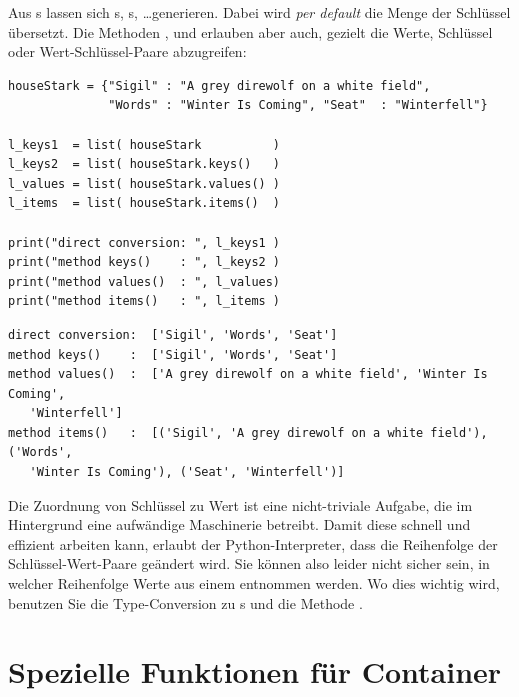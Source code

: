 Aus s lassen sich s, s, \ldots generieren. Dabei wird \emph{per default} die Menge der Schlüssel übersetzt. Die Methoden ,  und  erlauben aber auch, gezielt die Werte, Schlüssel oder Wert-Schlüssel-Paare abzugreifen:


\begin{codebox}
\begin{verbatim}
houseStark = {"Sigil" : "A grey direwolf on a white field",
              "Words" : "Winter Is Coming", "Seat"  : "Winterfell"}

l_keys1  = list( houseStark          )
l_keys2  = list( houseStark.keys()   )
l_values = list( houseStark.values() )
l_items  = list( houseStark.items()  )

print("direct conversion: ", l_keys1 )
print("method keys()    : ", l_keys2 )
print("method values()  : ", l_values)
print("method items()   : ", l_items )
\end{verbatim}
\end{codebox}
%
\begin{cmdbox}[Ausgabe]
\begin{verbatim}
direct conversion:  ['Sigil', 'Words', 'Seat']
method keys()    :  ['Sigil', 'Words', 'Seat']
method values()  :  ['A grey direwolf on a white field', 'Winter Is Coming', 
   'Winterfell']
method items()   :  [('Sigil', 'A grey direwolf on a white field'), ('Words',
   'Winter Is Coming'), ('Seat', 'Winterfell')]
\end{verbatim}
\end{cmdbox}

\begin{warnbox}
Die Zuordnung von Schlüssel zu Wert ist eine nicht-triviale Aufgabe, die im Hintergrund eine aufwändige Maschinerie betreibt. Damit diese schnell und effizient arbeiten kann, erlaubt der Python-Interpreter, dass die Reihenfolge der Schlüssel-Wert-Paare geändert wird. Sie können also leider nicht sicher sein, in welcher Reihenfolge Werte aus einem  entnommen werden. Wo dies wichtig wird, benutzen Sie \eg die Type-Conversion zu s und die Methode .
\end{warnbox}


\section{Spezielle Funktionen für Container}

